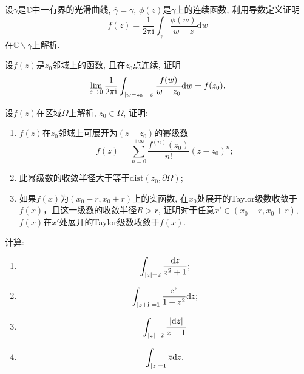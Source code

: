 \begin{yyEx}
    设$\gamma$是$\mathbb{C}$中一有界的光滑曲线, $\overline{\gamma} =  \gamma$, $\phi(z)$是$\gamma$上的连续函数, 利用导数定义证明\begin{equation*}
        f(z) = \frac{1}{2\mathrm{\pi}\mathrm{i}}\int_{\gamma}\frac{\phi(w)}{w-z}\mathrm{d}w
    \end{equation*}
    在$\mathbb{C}\backslash\gamma$上解析.
\end{yyEx}

\begin{yyEx}
    设$f(z)$是$z_0$邻域上的函数, 且在$z_0$点连续, 证明
    \begin{equation*}
        \lim_{\varepsilon\to 0}\frac{1}{2\mathrm{\pi}\mathrm{i}}\int_{\lvert w-z_0\rvert = \varepsilon}\frac{f(w)}{w-z_0}\mathrm{d}w = f(z_0).
    \end{equation*}
\end{yyEx}

\begin{yyEx}
    设$f(z)$在区域$\Omega$上解析, $z_0\in\Omega$, 证明:
    \begin{enumerate}
        \item $f(z)$在$z_0$邻域上可展开为$(z-z_0)$的幂级数\begin{equation*}
            f(z) = \sum_{n=0}^{+\infty}\frac{f^{(n)}(z_0)}{n!}(z-z_0)^n;
        \end{equation*}
        \item 此幂级数的收敛半径大于等于$\mathrm{dist}(z_0,\partial\Omega)$;
        \item 如果$f(x)$为$(x_0-r,x_0+r)$上的实函数, 在$x_0$处展开的Taylor级数收敛于$f(x)$，且这一级数的收敛半径$R>r$, 证明对于任意$x'\in(x_0-r,x_0+r)$,$f(x)$在$x'$处展开的Taylor级数收敛于$f(x)$.
    \end{enumerate}
\end{yyEx}

\begin{yyEx}
    计算:\begin{enumerate}
        \item \begin{equation*}
            \int_{\lvert z\rvert = 2}\frac{\mathrm{d}z}{z^2+1};
        \end{equation*}
        \item \begin{equation*}
            \int_{\lvert z+\mathrm{i}\rvert=1}\frac{\mathrm{e}^z}{1+z^2}\mathrm{d}z;
        \end{equation*}
        \item \begin{equation*}
            \int_{\lvert z\rvert=2}\frac{\lvert\mathrm{d}z\rvert}{z-1}
        \end{equation*}
        \item \begin{equation*}
            \int_{\lvert z\rvert = 1}\overline{z}\mathrm{d}z.
        \end{equation*}
    \end{enumerate}
\end{yyEx}

